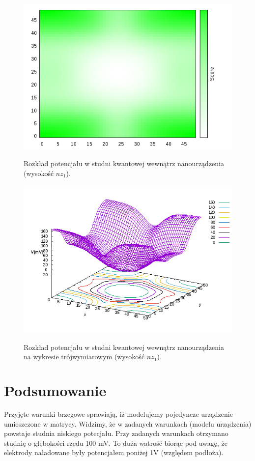 \documentclass[11pt]{article}
\begin{document}
\begin{figure}[h]
\begin{center}
\includegraphics[scale=0.66]{2.png}
\caption{Rozkład potencjału w studni kwantowej wewnątrz nanourządzenia (wysokość $nz_1$). }{\label{2}}
\end{center}
\end{figure}
\begin{figure}[h]
\begin{center}
\includegraphics[]{1.png}
\caption{Rozkład potencjału w studni kwantowej wewnątrz nanourządzenia na wykresie trójwymiarowym (wysokość $nz_1$).}{\label{1}}
\end{center}
\end{figure}

\section*{Podsumowanie}
Przyjęte warunki brzegowe sprawiają, iż modelujemy pojedyncze urządzenie umieszczone w 
matrycy. Widzimy, że w zadanych warunkach (modelu urządzenia) powstaje studnia niskiego potecjału. Przy zadanych warunkach otrzymano studnię 
o głębokości rzędu 100 mV. To duża watrość biorąc pod uwagę, że elektrody naładowane były potencjałem poniżej 1V (względem podłoża).
\end{document}
